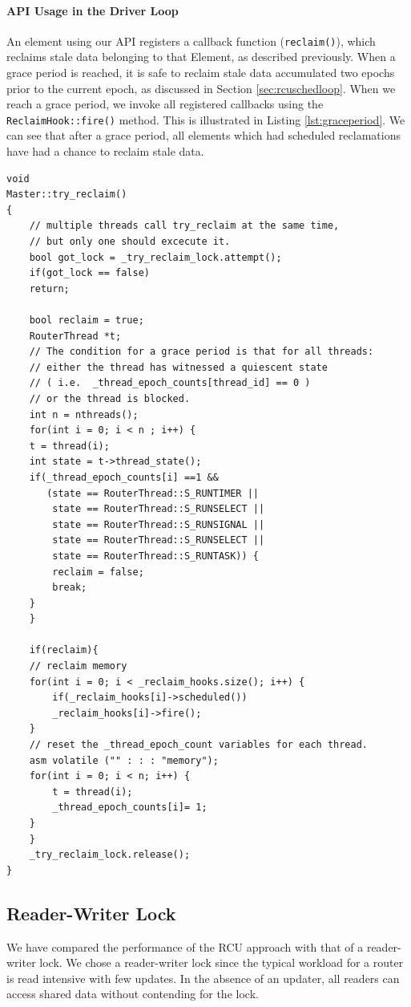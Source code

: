\documentclass[a4paper]{article}
\begin{document}
\paragraph{API Usage in the Driver Loop}
An element using our API registers a callback function (\texttt{reclaim()}), which reclaims stale data belonging to that Element, as described previously. When a grace period is reached, it is safe to reclaim stale data accumulated two epochs prior to the current epoch, as discussed in Section \ref{sec:rcuschedloop}. When we reach a grace period, we invoke all registered callbacks using the \texttt{ReclaimHook::fire()} method. This is illustrated in Listing \ref{lst:graceperiod}. We can see that after a grace period, all elements which had scheduled reclamations have had a chance to reclaim stale data.  
\begin{lstlisting}[float=pht, caption=Invoking callbacks for reclamations using the API.,label=lst:graceperiod, lineskip={-0.4pt}]
void 
Master::try_reclaim()
{
    // multiple threads call try_reclaim at the same time,
    // but only one should excecute it.
    bool got_lock = _try_reclaim_lock.attempt();
    if(got_lock == false)
	return;

    bool reclaim = true;
    RouterThread *t;
    // The condition for a grace period is that for all threads:
    // either the thread has witnessed a quiescent state
    // ( i.e.  _thread_epoch_counts[thread_id] == 0 )
    // or the thread is blocked.
    int n = nthreads();
    for(int i = 0; i < n ; i++) {
	t = thread(i);
	int state = t->thread_state();
	if(_thread_epoch_counts[i] ==1 && 
	   (state == RouterThread::S_RUNTIMER ||
	    state == RouterThread::S_RUNSELECT ||
	    state == RouterThread::S_RUNSIGNAL ||
	    state == RouterThread::S_RUNSELECT ||
	    state == RouterThread::S_RUNTASK)) {
	    reclaim = false;
	    break;
	}
    }

    if(reclaim){
	// reclaim memory
	for(int i = 0; i < _reclaim_hooks.size(); i++) {
	    if(_reclaim_hooks[i]->scheduled())
		_reclaim_hooks[i]->fire();
	}
	// reset the _thread_epoch_count variables for each thread.
	asm volatile ("" : : : "memory");
	for(int i = 0; i < n; i++) {
	    t = thread(i);
	    _thread_epoch_counts[i]= 1;
	}
    }
    _try_reclaim_lock.release();
}
\end{lstlisting}

\subsection{Reader-Writer Lock}
We have compared the performance of the RCU approach with that of a reader-writer lock. We chose a reader-writer lock since the typical workload for a router is read intensive with few updates. In the absence of an updater, all readers can access shared data without contending for the lock.\\
\end{document}
